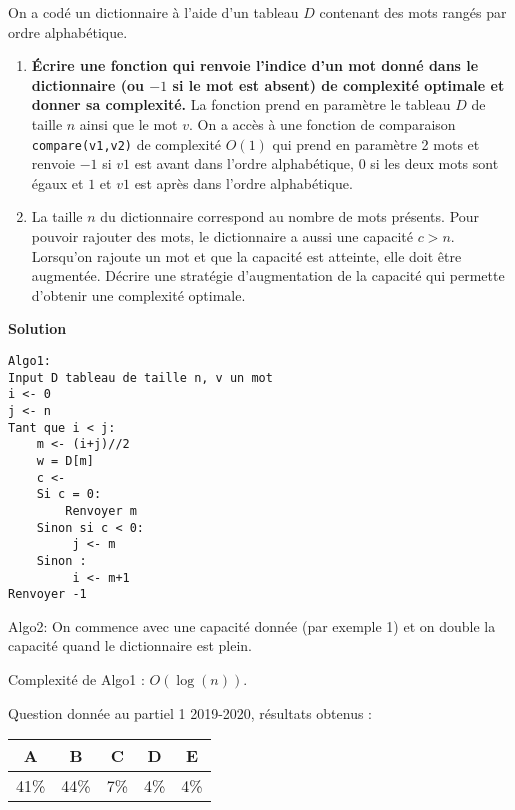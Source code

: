 
\begin{exercice}[2019-2020]
On a codé un dictionnaire à l'aide d'un tableau $D$ contenant des mots rangés par ordre alphabétique. 

\begin{enumerate}
\item \textbf{\'Ecrire une fonction qui renvoie l'indice d'un mot donné dans le dictionnaire (ou $-1$ si le mot est absent) de complexité optimale et donner sa complexité.} La fonction prend en paramètre le tableau $D$ de taille $n$ ainsi que le mot $v$. On a accès à une fonction de comparaison {\tt compare(v1,v2)} de complexité $O(1)$ qui prend en paramètre 2 mots et renvoie $-1$ si $v1$ est avant dans l'ordre alphabétique, 0 si les deux mots sont égaux et $1$ et $v1$ est après dans l'ordre alphabétique. 

\item La taille $n$ du dictionnaire correspond au nombre de mots présents. Pour pouvoir rajouter des mots, le dictionnaire a aussi une capacité $c > n$. Lorsqu'on rajoute un mot et que la capacité est atteinte, elle doit être augmentée. Décrire une stratégie d'augmentation de la capacité qui permette d'obtenir une complexité optimale.


\end{enumerate}


\textbf{Solution}

\begin{lstlisting}
Algo1:
Input D tableau de taille n, v un mot
i <- 0
j <- n
Tant que i < j:
    m <- (i+j)//2
    w = D[m]
    c <- 
    Si c = 0:
        Renvoyer m
    Sinon si c < 0:
         j <- m
    Sinon :
         i <- m+1
Renvoyer -1
\end{lstlisting}

Algo2:
On commence avec une capacité donnée (par exemple 1) et on double la capacité quand le dictionnaire est plein.

Complexité de Algo1 : $O(\log(n))$.

Question donnée au partiel 1 2019-2020, résultats obtenus :

\begin{tabular}{|c|c|c|c|c|}
\hline
A & B & C & D & E \\ \hline
41\% & 44\% & 7\% & 4\% & 4\% \\ \hline
\end{tabular} 



\end{exercice}


